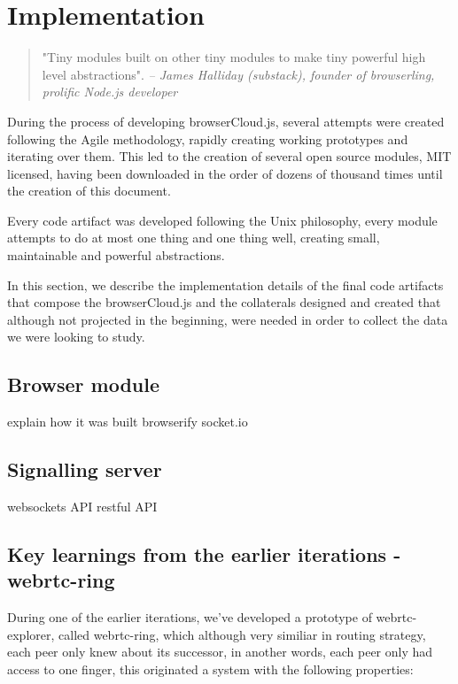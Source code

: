 \chapter{Implementation}\label{ch:implemenation}

\begin{quotation}
"Tiny modules built on other tiny modules to make tiny powerful high level abstractions".
{\small\it -- James Halliday (substack), founder of browserling, prolific Node.js developer}
\end{quotation}

During the process of developing browserCloud.js, several attempts were created following the Agile methodology, rapidly creating working prototypes and iterating over them. This led to the creation of several open source modules, MIT licensed, having been downloaded in the order of dozens of thousand times until the creation of this document.

Every code artifact was developed following the Unix philosophy, every module attempts to do at most one thing and one thing well, creating small, maintainable and powerful abstractions.

In this section, we describe the implementation details of the final code artifacts that compose the browserCloud.js and the collaterals designed and created that although not projected in the beginning, were needed in order to collect the data we were looking to study.

\section{Browser module}

explain how it was built
browserify
socket.io


\section{Signalling server}

websockets API
restful API


\section{Key learnings from the earlier iterations - webrtc-ring}

During one of the earlier iterations, we've developed a prototype of webrtc-explorer, called webrtc-ring, which although very similiar in routing strategy, each peer only knew about its successor, in another words, each peer only had access to one finger, this originated a system with the following properties:

